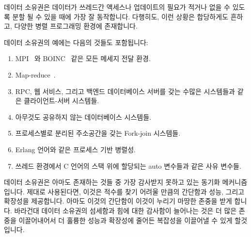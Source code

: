 데이터 소유권은 데이터가 쓰레드간 액세스나 업데이트의 필요가 적거나 없을 수
있도록 분할 될 수 있을 때에 가장 잘 동작합니다.
다행히도, 이런 상황은 합당하게도 흔하고, 다양한 병렬 프로그래밍 환경에
존재합니다.

데이터 소유권의 예에는 다음의 것들도 포함됩니다:
\iffalse

Data ownership works best when the data can be partitioned so that there
is little or no need for cross thread access or update.
Fortunately, this situation is reasonably common, and in a wide variety
of parallel-programming environments.

Examples of data ownership include:
\fi

\begin{enumerate}
\item	MPI~\cite{MPIForum2008} 와 BOINC~\cite{BOINC2008} 같은 모든 메세지 전달
	환경.
\item	Map-reduce~\cite{MapReduce2008MIT}.
\item	RPC, 웹 서비스, 그리고 백엔드 데이터베이스 서버를 갖는 수많은
	시스템들과 같은 클라이언트-서버 시스템들.
\item	아무것도 공유하지 않는 데이터베이스 시스템들.
\item	프로세스별로 분리된 주소공간을 갖는 Fork-join 시스템들.
\item	Erlang 언어와 같은 프로세스 기반 병렬성.
\item	쓰레드 환경에서 C 언어의 스택 위에 할당되는 auto 변수들과 같은 사유
	변수들.
\iffalse

\item	All message-passing environments, such as MPI~\cite{MPIForum2008}
	and BOINC~\cite{BOINC2008}.
\item	Map-reduce~\cite{MapReduce2008MIT}.
\item	Client-server systems, including RPC, web services, and
	pretty much any system with a back-end database server.
\item	Shared-nothing database systems.
\item	Fork-join systems with separate per-process address spaces.
\item	Process-based parallelism, such as the Erlang language.
\item	Private variables, for example, C-language on-stack auto variables,
	in threaded environments.
\fi
\end{enumerate}

데이터 소유권은 아마도 존재하는 것들 중 가장 감사받지 못하고 있는 동기화
메커니즘입니다.
제대로 사용된다면, 이것은 적수를 찾기 어려울 만큼의 간단함과 성능, 그리고
확장성을 제공합니다.
아마도 이것의 간단함이 이것이 누리기 마땅한 존중을 받게 합니다.
바라건대 데이터 소유권의 섬세함과 힘에 대한 감사함이 늘어나는 것은 더 많은
존중을 이끌어내어서 더 훌륭한 성능과 확장성에 줄어든 복잡성을 이끌어낼 수 있게
할것입니다.
\iffalse

